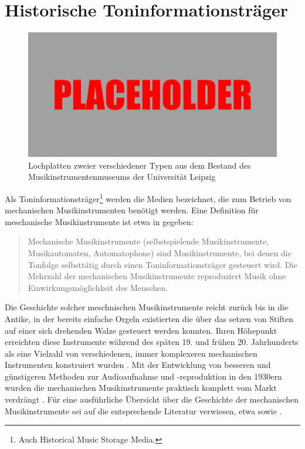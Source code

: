 \FloatBarrier
\section{Historische Toninformationsträger}

\begin{figure}[t]
    \centering
    \includegraphics[width=\textwidth]{graphics/placeholder.png}
    \caption{Lochplatten zweier verschiedener Typen aus dem Bestand des Musikinstrumentenmuseums der Universität Leipzig}
    \label{platten}
\end{figure}

Als Toninformationsträger\footnote{Auch Historical Music Storage Media.} werden die Medien bezeichnet, die zum Betrieb von mechanischen Musikinstrumenten benötigt werden.
Eine Definition für meschanische Musikinstrumente ist etwa in \textcite[]{mgg_mechanische} gegeben:

\begin{quotation}
    Mechanische Musikinstrumente (selbstspielende Musikinstrumente, Musikautomaten, Automatophone) sind Musikinstrumente, bei denen die Tonfolge selbsttätig durch einen Toninformationsträger gesteuert wird. Die Mehrzahl der mechanischen Musikinstrumente reproduziert Musik ohne Einwirkungsmöglichkeit des Menschen. \parencite[]{mgg_mechanische}
\end{quotation}

Die Geschichte solcher meschnischen Musikinstrumente reicht zurück bis in die Antike, in der bereits einfache Orgeln existierten die über das setzen von Stiften auf einer sich drehenden Walze gesteuert werden konnten.
Ihren Höhepunkt erreichten diese Instrumente während des späten 19. und frühen 20. Jahrhunderts als eine Vielzahl von verschiedenen, immer komplexeren mechanischen Instrumenten konstruiert wurden \parencite[10ff]{bowers_1972}.
Mit der Entwicklung von besseren und günstigeren Methoden zur Audioaufnahme und -reproduktion in den 1930ern wurden die mechanischen Musikinstrumente praktisch komplett vom Markt verdrängt \parencite[2]{zoltan_1994}.
Für eine ausführliche Übersicht über die Geschichte der mechanischen Musikinstrumente sei auf die entsprechende Literatur verwiesen, etwa \textcite[]{bowers_1972,bowers_1975} sowie \textcite[]{mgg_mechanische}.


